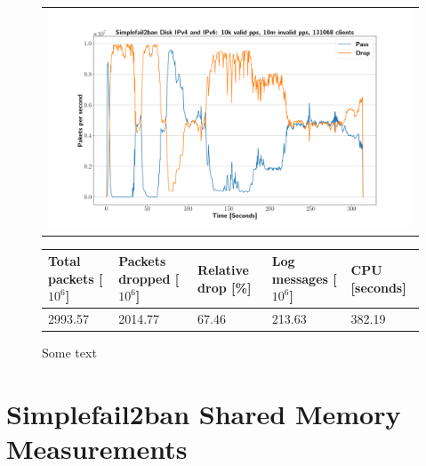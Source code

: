 \begin{figure}[p]
	\label{fig:simplefail2ban:disk:ip46:10m}
	\centering
	\scriptsize
	\begin{tabular}{c}
    	\centerline{\includegraphics[width=1.2\textwidth]{images/simplefail2ban_disk_ipv46_v10k_iv10m_c131068.png}}
	\end{tabular}
	\begin{tabular}{lllll}
		\toprule
		\textbf{Total packets [$10^6$]} & \textbf{Packets dropped [$10^6$]} & \textbf{Relative drop [\%]} & \textbf{Log messages [$10^6$]} & \textbf{CPU [seconds]} \\ \midrule 
		2993.57 & 2014.77 & 67.46 & 213.63 & 382.19 \\
		\bottomrule
	\end{tabular}
	\caption[Simplefail2ban Logfile IPv4 \& IPv6 10m PPS]{Some text}
\end{figure}

\section{Simplefail2ban Shared Memory Measurements}

